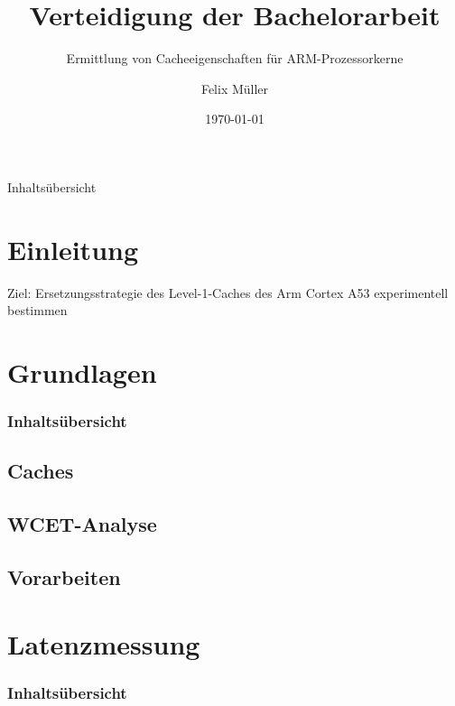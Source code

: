 \documentclass{beamer}
\title{Verteidigung der Bachelorarbeit}
\subtitle{Ermittlung von Cacheeigenschaften für
ARM-Prozessorkerne}
\author{Felix Müller}
\date{\today}
\begin{document}
\begin{frame}
\titlepage
\end{frame}

\begin{frame}{Inhaltsübersicht}
\tableofcontents
\end{frame}

\section{Einleitung}
\begin{frame}
	Ziel: Ersetzungsstrategie des Level-1-Caches des Arm Cortex A53 experimentell bestimmen
\end{frame}

\begin{frame}
	
\end{frame}

\section{Grundlagen}
\begin{frame}
	\frametitle{Inhaltsübersicht}
	\tableofcontents[currentsection]
\end{frame}

\subsection{Caches}
\begin{frame}
	
\end{frame}

\subsection{WCET-Analyse}
\begin{frame}
	
\end{frame}

\subsection{Vorarbeiten}
\begin{frame}
	
\end{frame}

\section{Latenzmessung}
\begin{frame}
	\frametitle{Inhaltsübersicht}
	\tableofcontents[currentsection]
\end{frame}
\end{document}
